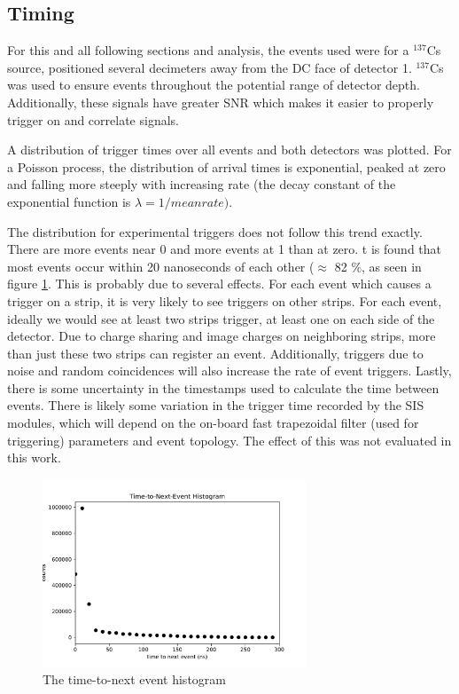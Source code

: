 \subsection*{Timing}

For this and all following sections and analysis, the events used were for a ${}^{137}$Cs  source, positioned several decimeters away from the DC face of detector 1. ${}^{137}$Cs was used to ensure events throughout the potential range of detector depth. Additionally, these signals have greater SNR which makes it easier to properly trigger on and correlate signals.

A distribution of trigger times over all events and both detectors was plotted. For a Poisson process, the distribution of arrival times is exponential, peaked at zero and falling more steeply with increasing rate (the decay constant of the exponential function is $\lambda = 1/mean rate)$. 

The distribution for experimental triggers does not follow this trend exactly. There are more events near 0 and more events at 1 than at zero. t is found that most events occur within 20 nanoseconds of each other ($\approx$ 82 $\%$, as seen in figure \ref{timehist}. This is probably due to several effects. For each event which causes a trigger on a strip, it is very likely to see triggers on other strips. For each event, ideally we would see at least two strips trigger, at least one on each side of the detector. Due to charge sharing and image charges on neighboring strips, more than just these two strips can register an event. Additionally, triggers due to noise and random coincidences will also increase the rate of event triggers. Lastly, there is some uncertainty in the timestamps used to calculate the time between events. There is likely some variation in the trigger time recorded by the SIS modules, which will depend on the on-board fast trapezoidal filter (used for triggering) parameters and event topology. The effect of this was not evaluated in this work.

\begin{figure}
\begin{centering}
\includegraphics[width=0.7\textwidth]{./figures/time-to-next-event.pdf}
\caption{The time-to-next event histogram}
\label{timehist}
\end{centering}
\end{figure}

